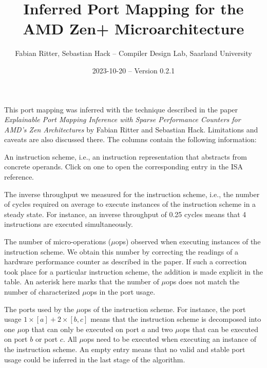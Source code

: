 \documentclass[a4paper,english,fontsize=9]{scrartcl}
\begin{document}
\title{Inferred Port Mapping for the AMD Zen+ Microarchitecture}
\author{Fabian Ritter, Sebastian Hack -- Compiler Design Lab, Saarland University}
\date{2023-10-20 -- Version 0.2.1}
\maketitle

\noindent
This port mapping was inferred with the technique described in the paper \emph{Explainable Port Mapping Inference with Sparse Performance Counters for AMD’s Zen Architectures} by Fabian Ritter and Sebastian Hack.
Limitations and caveats are also discussed there.
The columns contain the following information:
    \begin{description}[labelindent=0.5cm, leftmargin=1.0cm]
        \item[Instruction Scheme:] An instruction scheme, i.e., an instruction representation that abstracts from concrete operands. Click on one to open the corresponding entry in the ISA reference.
        \item[\(\mathit{tp}^{-1}\):] The inverse throughput we measured for the instruction scheme, i.e., the number of cycles required on average to execute instances of the instruction scheme in a steady state.
            For instance, an inverse throughput of 0.25 cycles means that 4 instructions are executed simultaneously.
        \item[\#\(\mu\)ops:] The number of micro-operations (\(\mu\)ops) observed when executing instances of the instruction scheme.
            We obtain this number by correcting the readings of a hardware performance counter as described in the paper.
            If such a correction took place for a particular instruction scheme, the addition is made explicit in the table.
            An asterisk here marks that the number of \(\mu\)ops does not match the number of characterized \(\mu\)ops in the port usage.
        \item[Port Usage:] The ports used by the \(\mu\)ops of the instruction scheme.
            For instance, the port usage \(1\times [a] + 2\times [b, c]\) means that the instruction scheme is decomposed into one \(\mu\)op that can only be executed on port \(a\) and two \(\mu\)ops that can be executed on port $b$ or port $c$.
            All \(\mu\)ops need to be executed when executing an instance of the instruction scheme.
            An empty entry means that no valid and stable port usage could be inferred in the last stage of the algorithm.
    \end{description}
\end{document}

